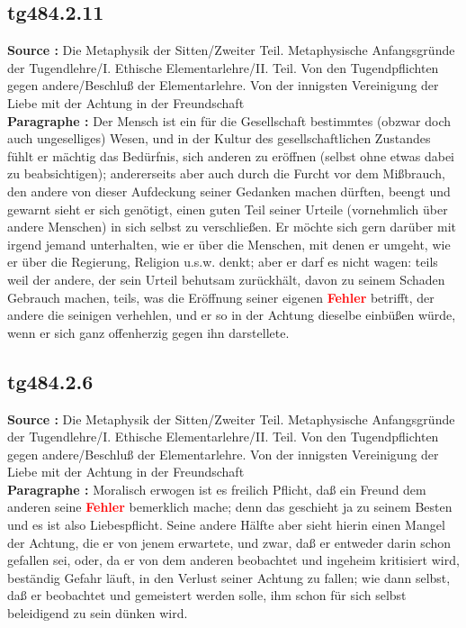 \documentclass[a4paper,12pt,twoside]{book}
\newcommand{\match}[1]{\textcolor{red}{\textbf{#1}}}
\begin{document}
	\subsection*{tg484.2.11} 
	\textbf{Source : }Die Metaphysik der Sitten/Zweiter Teil. Metaphysische Anfangsgründe der Tugendlehre/I. Ethische Elementarlehre/II. Teil. Von den Tugendpflichten gegen andere/Beschluß der Elementarlehre. Von der innigsten Vereinigung der Liebe mit der Achtung in der Freundschaft\\  
	
	\textbf{Paragraphe : }Der Mensch ist ein für die Gesellschaft bestimmtes (obzwar doch auch ungeselliges) Wesen, und in der Kultur des gesellschaftlichen Zustandes fühlt er mächtig das Bedürfnis, sich anderen zu eröffnen (selbst ohne etwas dabei zu beabsichtigen); andererseits aber auch durch die Furcht vor dem Mißbrauch, den andere von dieser Aufdeckung seiner Gedanken machen dürften, beengt und gewarnt sieht er sich genötigt, einen guten Teil seiner Urteile (vornehmlich über andere Menschen) in sich selbst zu verschließen. Er möchte sich gern darüber mit irgend jemand unterhalten, wie er über die Menschen, mit denen er umgeht, wie er über die Regierung, Religion u.s.w. denkt; aber er darf es nicht wagen: teils weil der andere, der sein Urteil behutsam zurückhält, davon zu seinem Schaden Gebrauch machen, teils, was die Eröffnung seiner eigenen \match{Fehler} betrifft, der andere die seinigen verhehlen, und er so in der Achtung dieselbe einbüßen würde, wenn er sich ganz offenherzig gegen ihn darstellete. 
	
	\subsection*{tg484.2.6} 
	\textbf{Source : }Die Metaphysik der Sitten/Zweiter Teil. Metaphysische Anfangsgründe der Tugendlehre/I. Ethische Elementarlehre/II. Teil. Von den Tugendpflichten gegen andere/Beschluß der Elementarlehre. Von der innigsten Vereinigung der Liebe mit der Achtung in der Freundschaft\\  
	
	\textbf{Paragraphe : }Moralisch erwogen ist es freilich Pflicht, daß ein Freund dem anderen seine \match{Fehler} bemerklich mache; denn das geschieht  ja zu seinem Besten und es ist also Liebespflicht. Seine andere Hälfte aber sieht hierin einen Mangel der Achtung, die er von jenem erwartete, und zwar, daß er entweder darin schon gefallen sei, oder, da er von dem anderen beobachtet und ingeheim kritisiert wird, beständig Gefahr läuft, in den Verlust seiner Achtung zu fallen; wie dann selbst, daß er beobachtet und gemeistert werden solle, ihm schon für sich selbst beleidigend zu sein dünken wird. 
	
\end{document}

